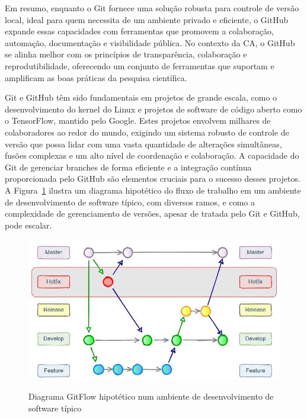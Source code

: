 \documentclass[
  a4paper,
]{book}
\begin{document}
Em resumo, enquanto o Git fornece uma solução robusta para controle de
versão local, ideal para quem necessita de um ambiente privado e
eficiente, o GitHub expande essas capacidades com ferramentas que
promovem a colaboração, automação, documentação e visibilidade pública.
No contexto da CA, o GitHub se alinha melhor com os princípios de
transparência, colaboração e reprodutibilidade, oferecendo um conjunto
de ferramentas que suportam e amplificam as boas práticas da pesquisa
científica.

Git e GitHub têm sido fundamentais em projetos de grande escala, como o
desenvolvimento do kernel do Linux e projetos de software de código
aberto como o TensorFlow, mantido pelo Google. Estes projetos envolvem
milhares de colaboradores ao redor do mundo, exigindo um sistema robusto
de controle de versão que possa lidar com uma vasta quantidade de
alterações simultâneas, fusões complexas e um alto nível de coordenação
e colaboração. A capacidade do Git de gerenciar branches de forma
eficiente e a integração contínua proporcionada pelo GitHub são
elementos cruciais para o sucesso desses projetos. A
Figura~\ref{fig-gitflow} ilustra um diagrama hipotético do fluxo de
trabalho em um ambiente de desenvolvimento de software típico, com
diversos ramos, e como a complexidade de gerenciamento de versões,
apesar de tratada pelo Git e GitHub, pode escalar.

\begin{figure}

\href{https://www.theserverside.com/blog/Coffee-Talk-Java-News-Stories-and-Opinions/Gitflow-release-branch-process-start-finish}{\includegraphics{img/gitflow.jpg}}

\caption{\label{fig-gitflow}Diagrama GitFlow hipotético num ambiente de
desenvolvimento de software típico}

\end{figure}%
\end{document}
